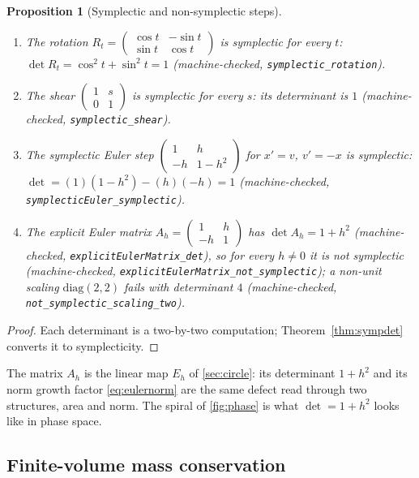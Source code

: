 \documentclass[11pt,a4paper]{article}
\newtheorem{proposition}[theorem]{Proposition}
\begin{document}
\begin{proposition}[Symplectic and non-symplectic steps]
\label{thm:sympexamples}
\begin{enumerate}[label=\textup{(\alph*)},nosep]
\item The rotation
  $R_t = \begin{pmatrix} \cos t & -\sin t \\ \sin t & \cos t
  \end{pmatrix}$
  is symplectic for every $t$:
  $\det R_t = \cos^2 t + \sin^2 t = 1$
  (machine-checked, \texttt{symplectic\_rotation}).
\item The shear
  $\begin{pmatrix} 1 & s \\ 0 & 1 \end{pmatrix}$ is symplectic for
  every $s$: its determinant is $1$
  (machine-checked, \texttt{symplectic\_shear}).
\item The symplectic Euler step
  $\begin{pmatrix} 1 & h \\ -h & 1 - h^2 \end{pmatrix}$
  for $x' = v$, $v' = -x$ is symplectic:
  $\det = (1)(1 - h^2) - (h)(-h) = 1$
  (machine-checked, \texttt{symplecticEuler\_symplectic}).
\item The explicit Euler matrix
  $A_h = \begin{pmatrix} 1 & h \\ -h & 1 \end{pmatrix}$
  has $\det A_h = 1 + h^2$
  (machine-checked, \texttt{explicitEulerMatrix\_det}), so for every
  $h \neq 0$ it is not symplectic
  (machine-checked, \texttt{explicitEulerMatrix\_not\_symplectic});
  a non-unit scaling $\mathrm{diag}(2,2)$ fails with determinant $4$
  (machine-checked, \texttt{not\_symplectic\_scaling\_two}).
\end{enumerate}
\end{proposition}
\begin{proof}
Each determinant is a two-by-two computation;
Theorem~\ref{thm:sympdet} converts it to symplecticity.
\end{proof}

The matrix $A_h$ is the linear map $E_h$ of \cref{sec:circle}: its
determinant $1 + h^2$ and its norm growth factor \cref{eq:eulernorm}
are the same defect read through two structures, area and norm.
The spiral of \cref{fig:phase} is what $\det = 1 + h^2$ looks like in
phase space.

\subsection{Finite-volume mass conservation}
\end{document}
